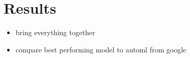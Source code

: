 \chapter{Results}
\begin{itemize}
\item bring everything together
\item compare best performing model to automl from google
\end{itemize}